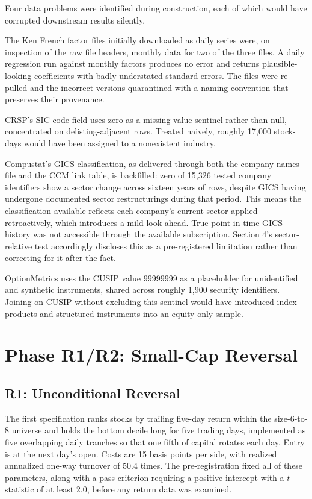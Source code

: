 \documentclass[11pt]{article}
\begin{document}
Four data problems were identified during construction, each of which would have corrupted downstream results silently.

The Ken French factor files initially downloaded as daily series were, on inspection of the raw file headers, monthly data for two of the three files. A daily regression run against monthly factors produces no error and returns plausible-looking coefficients with badly understated standard errors. The files were re-pulled and the incorrect versions quarantined with a naming convention that preserves their provenance.

CRSP's SIC code field uses zero as a missing-value sentinel rather than null, concentrated on delisting-adjacent rows. Treated naively, roughly 17,000 stock-days would have been assigned to a nonexistent industry.

Compustat's GICS classification, as delivered through both the company names file and the CCM link table, is backfilled: zero of 15,326 tested company identifiers show a sector change across sixteen years of rows, despite GICS having undergone documented sector restructurings during that period. This means the classification available reflects each company's current sector applied retroactively, which introduces a mild look-ahead. True point-in-time GICS history was not accessible through the available subscription. Section 4's sector-relative test accordingly discloses this as a pre-registered limitation rather than correcting for it after the fact.

OptionMetrics uses the CUSIP value 99999999 as a placeholder for unidentified and synthetic instruments, shared across roughly 1,900 security identifiers. Joining on CUSIP without excluding this sentinel would have introduced index products and structured instruments into an equity-only sample.
\section{Phase R1/R2: Small-Cap Reversal}
\subsection{R1: Unconditional Reversal}

The first specification ranks stocks by trailing five-day return within the size-6-to-8 universe and holds the bottom decile long for five trading days, implemented as five overlapping daily tranches so that one fifth of capital rotates each day. Entry is at the next day's open. Costs are 15 basis points per side, with realized annualized one-way turnover of 50.4 times. The pre-registration fixed all of these parameters, along with a pass criterion requiring a positive intercept with a $t$-statistic of at least 2.0, before any return data was examined.
\end{document}

